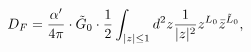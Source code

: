 \begin{equation}
 D_F = {{\alpha'} \over {4\pi}} \cdot {\tilde G}_0 \cdot {1 \over 2}
       \int_{|z| \le 1} d^2z {1 \over {|z|^2}}
       z^{L_0} {\bar z}^{{\tilde L}_0},
\label{prop_op_F}
\end{equation}

